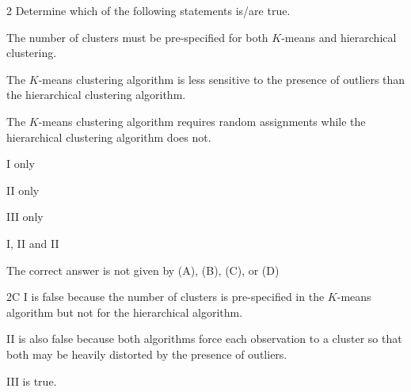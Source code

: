 \begin{question}{2}
Determine which of the following statements is/are true.
\begin{statements}
\item The number of clusters must be pre-specified for both $K$-means and hierarchical clustering.
\item The $K$-means clustering algorithm is less sensitive to the presence of outliers than the hierarchical clustering algorithm.
\item The $K$-means clustering algorithm requires random assignments while the hierarchical clustering algorithm does not.
\end{statements}

\begin{choices}
\item I only
\item II only
\item III only
\item I, II and II
\item The correct answer is not given by (A), (B), (C), or (D)
\end{choices}
\end{question}
\begin{solution}{2}{C}
I is false because the number of clusters is pre-specified in the $K$-means algorithm but not for the hierarchical algorithm.

II is also false because both algorithms force each observation to a cluster so that both may be heavily distorted by the presence of outliers.

III is true.
\end{solution}

